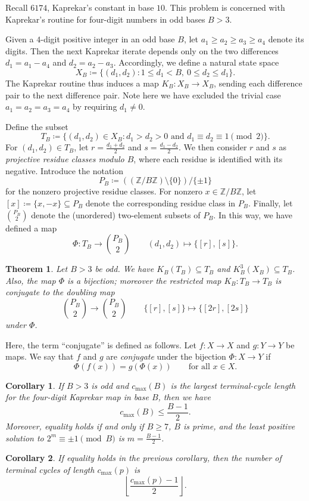 \documentclass[11pt]{amsart}
\newtheorem{theorem}{Theorem}
\newtheorem{corollary}{Corollary}
\begin{document}
Recall $6174$, Kaprekar's constant in base $10$.
This problem is concerned with Kaprekar's routine for four-digit numbers
in odd bases $B > 3$.

Given a $4$-digit positive integer in an odd base $B$,
let $a_1 \ge a_2 \ge a_3 \ge a_4$ denote its digits.
Then the next Kaprekar iterate depends only on the two differences
$d_1=a_1-a_4$ and $d_2=a_2-a_3$.
Accordingly, we define a natural state space
\[ X_B \coloneq \{(d_1,d_2):1\leq d_1<B,\ 0\leq d_2\leq d_1\}. \]
The Kaprekar routine thus induces a map $K_B \colon X_B\to X_B$,
sending each difference pair to the next difference pair.
Note here we have excluded the trivial case $a_1 = a_2 = a_3 = a_4$ by requiring $d_1 \neq 0$.

Define the subset
\[ T_B \coloneq \{(d_1,d_2)\in X_B: d_1>d_2>0 \text{ and } d_1\equiv d_2\equiv1\pmod2\}. \]
For $(d_1, d_2) \in T_B$, let $r = \frac{d_1 + d_2}{2}$ and $s = \frac{d_1 - d_2}{2}$.
We then consider $r$ and $s$ as \emph{projective residue classes modulo $B$},
where each residue is identified with its negative.
Introduce the notation
\[ P_B \coloneq \left( (\mathbb{Z}/B\mathbb{Z}) \setminus \{0\} \right) / \{\pm1\}  \]
for the nonzero projective residue classes.
For nonzero $x \in \mathbb{Z}/B\mathbb{Z}$, let $[x] \coloneq \{x,-x\} \subseteq P_B$
denote the corresponding residue class in $P_B$.
Finally, let $\binom{P_B}{2}$ denote the (unordered) two-element subsets of $P_B$.
In this way, we have defined a map
\[ \Phi \colon T_B \to \binom{P_B}{2} \qquad (d_1, d_2) \mapsto \{[r],[s]\}. \]

\begin{theorem}\label{thm:structural}
  Let $B > 3$ be odd.
  We have $K_B(T_B) \subseteq T_B$ and $K_B^3(X_B)\subseteq T_B$.
  Also, the map $\Phi$ is a bijection; moreover
  the restricted map $K_B \colon T_B\to T_B$ is conjugate to the doubling map
  \[ \binom{P_B}{2} \to \binom{P_B}{2} \qquad \{[r],[s]\} \mapsto \{[2r],[2s]\} \]
  under $\Phi$.
\end{theorem}

Here, the term ``conjugate'' is defined as follows.
Let $f \colon X\to X$ and $g \colon Y\to Y$ be maps.
We say that $f$ and $g$ are \emph{conjugate} under the bijection
$\Phi \colon X\to Y$ if
\[ \Phi(f(x))=g(\Phi(x)) \qquad\text{for all }x\in X.  \]

\begin{corollary}\label{cor:length}
If $B>3$ is odd and $c_{\max}(B)$ is the largest terminal-cycle length for the
four-digit Kaprekar map in base $B$, then we have
\[ c_{\max}(B)\le \frac{B-1}{2}.  \]
Moreover, equality holds if and only if $B \ge 7$, $B$ is prime,
and the least positive solution to $2^m \equiv \pm 1 \pmod B$ is $m = \frac{B-1}{2}$.
\end{corollary}

\begin{corollary}\label{cor:prime}
  If equality holds in the previous corollary,
  then the number of terminal cycles of length $c_{\max}(p)$ is
  \[ \left\lfloor\frac{c_{\max}(p)-1}{2}\right\rfloor.  \]
\end{corollary}
\end{document}
